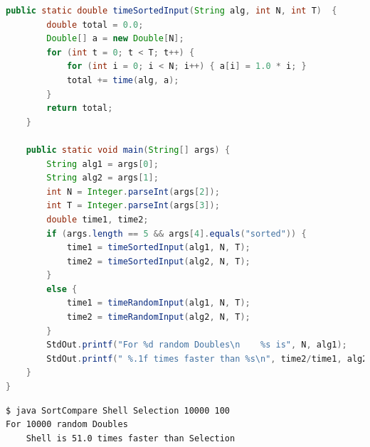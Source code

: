 \documentclass[8pt,a4paper,compress]{beamer}
\begin{document}
\begin{frame}[fragile]
\pause

\begin{lstlisting}[language=Java]
    public static double timeSortedInput(String alg, int N, int T)  {
        double total = 0.0; 
        Double[] a = new Double[N]; 
        for (int t = 0; t < T; t++) {
            for (int i = 0; i < N; i++) { a[i] = 1.0 * i; }
            total += time(alg, a); 
        } 
        return total; 
    } 

    public static void main(String[] args) { 
        String alg1 = args[0]; 
        String alg2 = args[1]; 
        int N = Integer.parseInt(args[2]);
        int T = Integer.parseInt(args[3]);
        double time1, time2;
        if (args.length == 5 && args[4].equals("sorted")) {
            time1 = timeSortedInput(alg1, N, T);
            time2 = timeSortedInput(alg2, N, T);
        }
        else {
            time1 = timeRandomInput(alg1, N, T);
            time2 = timeRandomInput(alg2, N, T);
        }
        StdOut.printf("For %d random Doubles\n    %s is", N, alg1); 
        StdOut.printf(" %.1f times faster than %s\n", time2/time1, alg2); 
    } 
}
\end{lstlisting}

\pause

\begin{lstlisting}[language={}]
$ java SortCompare Shell Selection 10000 100
For 10000 random Doubles
    Shell is 51.0 times faster than Selection
\end{lstlisting}
\end{frame}
\end{document}
